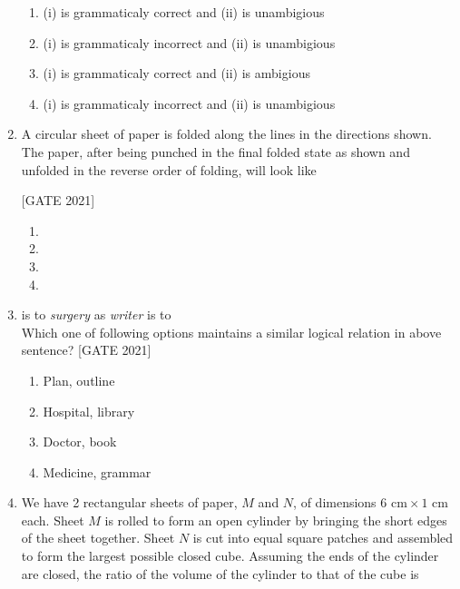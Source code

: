 \documentclass[journal,12pt,onecolumn]{IEEEtran}
\theoremstyle{remark}
\begin{document}
\begin{enumerate}
\begin{enumerate}
\item (i) is grammaticaly correct and (ii) is unambigious
\item (i) is grammaticaly incorrect and (ii) is unambigious
\item (i) is grammaticaly correct and (ii) is ambigious
\item (i) is grammaticaly incorrect and (ii) is unambigious
\end{enumerate}
\item A circular sheet of paper is folded along the lines in the directions shown. The paper, after being punched in the final folded state as shown and unfolded in the reverse order of folding, will look like 

\hfill{[GATE 2021]}\begin{multicols}{2}
\begin{enumerate}
    \item  
      \item 
      \item 
     \item 
\end{enumerate}
\end{multicols}



     \item \underline{\hspace{1.5cm}} is to \textit{surgery} as \textit{writer} is to \underline{\hspace{1.5cm}}\\
     Which one of following options maintains a similar logical relation in above sentence?
     \hfill{[GATE 2021]}\begin{multicols}{2}
     \begin{enumerate}
     \item Plan, outline
     \item Hospital, library
     \item Doctor, book
     \item Medicine, grammar
     \end{enumerate}
     \end{multicols}
\item We have 2 rectangular sheets of paper, $ M $ and $ N $, of dimensions $ 6  \text{ cm} \times 1  \text{ cm} $ each. Sheet $ M $ is rolled to form an open cylinder by bringing the short edges of the sheet together. Sheet $ N $ is cut into equal square patches and assembled to form the largest possible closed cube. Assuming the ends of the cylinder are closed, the ratio of the volume of the cylinder to that of the cube is


\end{enumerate}
\end{document}
